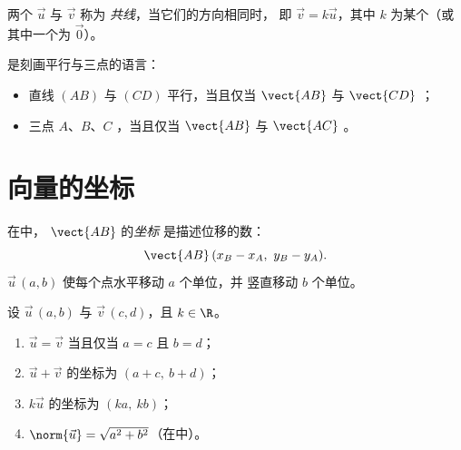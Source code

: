 \begin{definition}[共线]\label{def:g10:vectors:collinear}
两个 $\vec u$ 与 $\vec v$ 称为
\emph{共线}，当它们的方向相同时，
即 $\vec v = k \vec u$，其中 $k$ 为某个（或其中一个为
$\vec 0$）。
\end{definition}

\begin{remark}
是刻画平行与三点的语言：
\begin{itemize}
  \item 直线 $(AB)$ 与 $(CD)$ 平行，当且仅当 $\vect{AB}$
        与 $\vect{CD}$ ；
  \item 三点 $A$、$B$、$C$ ，当且仅当 $\vect{AB}$ 与
        $\vect{AC}$ 。
\end{itemize}
\end{remark}

\section{向量的坐标}

\begin{definition}[向量的坐标]\label{def:g10:vectors:coords}
在中， $\vect{AB}$ 的\emph{坐标}
是描述位移的数：
\[
\vect{AB}\,(x_B - x_A,\ y_B - y_A).
\]
 $\vec u\,(a, b)$ 使每个点水平移动 $a$ 个单位，并
竖直移动 $b$ 个单位。
\end{definition}

\begin{proposition}[利用坐标进行计算]\label{prop:g10:vectors:coordrules}
设 $\vec u\,(a, b)$ 与 $\vec v\,(c, d)$，且 $k \in \R$。
\begin{enumerate}
  \item $\vec u = \vec v$ 当且仅当 $a = c$ 且 $b = d$；
  \item $\vec u + \vec v$ 的坐标为 $(a + c,\ b + d)$；
  \item $k\vec u$ 的坐标为 $(ka,\ kb)$；
  \item $\norm{\vec u} = \sqrt{a^2 + b^2}$（在中）。
\end{enumerate}
\end{proposition}

